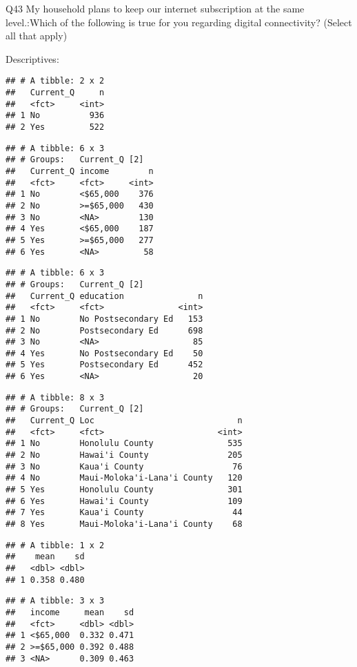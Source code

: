 \documentclass[]{article}
\begin{document}
Q43 My household plans to keep our internet subscription at the same
level.:Which of the following is true for you regarding digital
connectivity? (Select all that apply)

Descriptives:

\begin{verbatim}
## # A tibble: 2 x 2
##   Current_Q     n
##   <fct>     <int>
## 1 No          936
## 2 Yes         522
\end{verbatim}

\begin{verbatim}
## # A tibble: 6 x 3
## # Groups:   Current_Q [2]
##   Current_Q income        n
##   <fct>     <fct>     <int>
## 1 No        <$65,000    376
## 2 No        >=$65,000   430
## 3 No        <NA>        130
## 4 Yes       <$65,000    187
## 5 Yes       >=$65,000   277
## 6 Yes       <NA>         58
\end{verbatim}

\begin{verbatim}
## # A tibble: 6 x 3
## # Groups:   Current_Q [2]
##   Current_Q education               n
##   <fct>     <fct>               <int>
## 1 No        No Postsecondary Ed   153
## 2 No        Postsecondary Ed      698
## 3 No        <NA>                   85
## 4 Yes       No Postsecondary Ed    50
## 5 Yes       Postsecondary Ed      452
## 6 Yes       <NA>                   20
\end{verbatim}

\begin{verbatim}
## # A tibble: 8 x 3
## # Groups:   Current_Q [2]
##   Current_Q Loc                             n
##   <fct>     <fct>                       <int>
## 1 No        Honolulu County               535
## 2 No        Hawai'i County                205
## 3 No        Kaua'i County                  76
## 4 No        Maui-Moloka'i-Lana'i County   120
## 5 Yes       Honolulu County               301
## 6 Yes       Hawai'i County                109
## 7 Yes       Kaua'i County                  44
## 8 Yes       Maui-Moloka'i-Lana'i County    68
\end{verbatim}

\begin{verbatim}
## # A tibble: 1 x 2
##    mean    sd
##   <dbl> <dbl>
## 1 0.358 0.480
\end{verbatim}

\begin{verbatim}
## # A tibble: 3 x 3
##   income     mean    sd
##   <fct>     <dbl> <dbl>
## 1 <$65,000  0.332 0.471
## 2 >=$65,000 0.392 0.488
## 3 <NA>      0.309 0.463
\end{verbatim}
\end{document}
